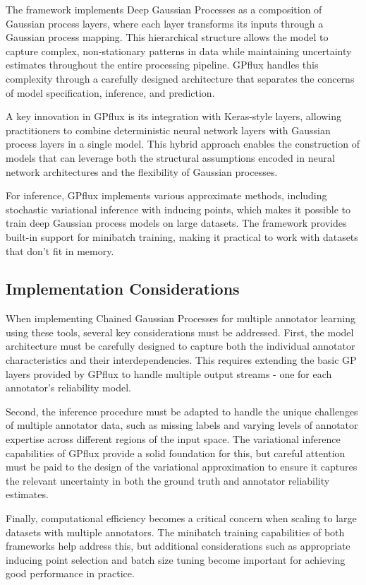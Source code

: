 The framework implements Deep Gaussian Processes as a composition of
Gaussian process layers, where each layer transforms its inputs
through a Gaussian process mapping. This hierarchical structure
allows the model to capture complex, non-stationary patterns in data
while maintaining uncertainty estimates throughout the entire
processing pipeline. GPflux handles this complexity through a
carefully designed architecture that separates the concerns of model
specification, inference, and prediction.

A key innovation in GPflux is its integration with Keras-style
layers, allowing practitioners to combine deterministic neural
network layers with Gaussian process layers in a single model. This
hybrid approach enables the construction of models that can leverage
both the structural assumptions encoded in neural network
architectures and the flexibility of Gaussian processes.

For inference, GPflux implements various approximate methods,
including stochastic variational inference with inducing points,
which makes it possible to train deep Gaussian process models on
large datasets. The framework provides built-in support for minibatch
training, making it practical to work with datasets that don't fit in memory.

\subsection{Implementation Considerations}

When implementing Chained Gaussian Processes for multiple annotator
learning using these tools, several key considerations must be
addressed. First, the model architecture must be carefully designed
to capture both the individual annotator characteristics and their
interdependencies. This requires extending the basic GP layers
provided by GPflux to handle multiple output streams - one for each
annotator's reliability model.

Second, the inference procedure must be adapted to handle the unique
challenges of multiple annotator data, such as missing labels and
varying levels of annotator expertise across different regions of the
input space. The variational inference capabilities of GPflux provide
a solid foundation for this, but careful attention must be paid to
the design of the variational approximation to ensure it captures the
relevant uncertainty in both the ground truth and annotator
reliability estimates.

Finally, computational efficiency becomes a critical concern when
scaling to large datasets with multiple annotators. The minibatch
training capabilities of both frameworks help address this, but
additional considerations such as appropriate inducing point
selection and batch size tuning become important for achieving good
performance in practice.

